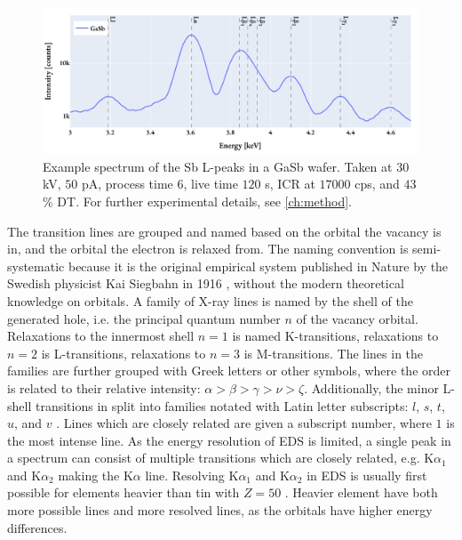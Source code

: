 \begin{figure}[p]
    \centering
    \includegraphics[width=0.99\linewidth]{figures/Sb_L-peaks_30kV_50pA.pdf}
    \caption{
        Example spectrum of the Sb L-peaks in a GaSb wafer.
        Taken at $30$ kV, $50$ pA, process time $6$, live time $120$ s, ICR at $17000$ cps, and $43$\% DT.
        For further experimental details, see \cref{ch:method}.
    }
    \label{fig:theory:xray_formation:Sb_L-peaks}
\end{figure}


The transition lines are grouped and named based on the orbital the vacancy is in, and the orbital the electron is relaxed from.
The naming convention is semi-systematic because it is the original empirical system published in Nature by the Swedish physicist Kai Siegbahn in 1916 \cite{siegbahn_relations_1916}, without the modern theoretical knowledge on orbitals.
A family of X-ray lines is named by the shell of the generated hole, i.e. the principal quantum number $n$ of the vacancy orbital.
Relaxations to the innermost shell $n=1$ is named K-transitions, relaxations to $n=2$ is L-transitions, relaxations to $n=3$ is M-transitions.
The lines in the families are further grouped with Greek letters or other symbols, where the order is related to their relative intensity: $\alpha > \beta > \gamma > \nu > \zeta$.
Additionally, the minor L-shell transitions in split into families notated with Latin letter subscripts: $l$, $s$, $t$, $u$, and $v$ \cite[Ch. 4.2.4]{goldstein_scanning_2018}.
Lines which are closely related are given a subscript number, where $1$ is the most intense line.
As the energy resolution of EDS is limited, a single peak in a spectrum can consist of multiple transitions which are closely related, e.g. K$\alpha_1$ and K$\alpha_2$ making the K$\alpha$ line.
Resolving K$\alpha_1$ and K$\alpha_2$ in EDS is usually first possible for elements heavier than tin with $ Z = 50$ \cite[Ch. 8.2.2.3]{hollas_modern_2004}. %
Heavier element have both more possible lines and more resolved lines, as the orbitals have higher energy differences.



